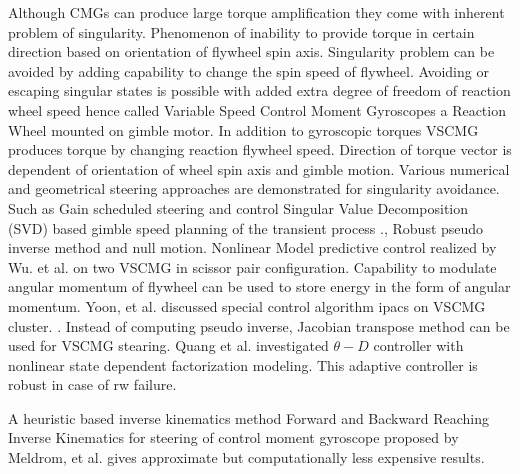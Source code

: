Although CMGs can produce large torque amplification they come with inherent problem of singularity. Phenomenon of inability to provide torque in certain direction based on orientation of flywheel spin axis. Singularity problem can be avoided by adding capability to change the spin speed of flywheel. Avoiding or escaping singular states is possible with added extra degree of freedom of reaction wheel speed hence called Variable Speed Control Moment Gyroscopes a Reaction Wheel mounted on gimble motor. In addition to gyroscopic torques VSCMG produces torque by changing reaction flywheel speed. Direction of torque vector is dependent of orientation of wheel spin axis and gimble motion. Various numerical and geometrical steering approaches are demonstrated for singularity avoidance. Such as Gain scheduled steering and control \cite{SASAKI2017} Singular Value Decomposition (SVD) based gimble speed planning of the transient process \cite{Huang2016}., Robust pseudo inverse method and null motion. Nonlinear Model predictive control realized by Wu. et al. on two VSCMG in scissor pair configuration.  Capability to modulate angular momentum of flywheel can be used to store energy in the form of angular momentum. Yoon, et al. discussed special control algorithm \acrfull{ipacs} on VSCMG cluster. \cite{Yoon2002}. Instead of computing pseudo inverse, Jacobian transpose method can be used for VSCMG stearing. \cite{ KRISHNAN1996431} Quang et al. investigated $\theta-D$ controller with nonlinear state dependent factorization modeling. This adaptive controller is robust in case of \acrshort{rw} failure. \cite{LamThetaD}

A heuristic based inverse kinematics method Forward and Backward Reaching Inverse Kinematics for steering of control moment gyroscope proposed by Meldrom, et al. gives approximate but computationally less expensive results.\cite{MELDRUM2018}
\\

